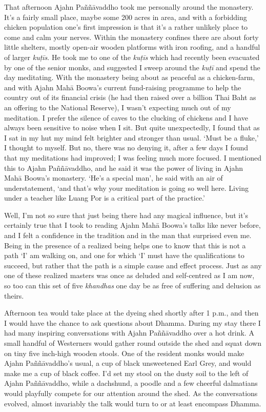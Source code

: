 That afternoon Ajahn Paññāvaddho took me personally around the
monastery. It's a fairly small place, maybe some 200 acres in area, and
with a forbidding chicken population one's first impression is that it's
a rather unlikely place to come and calm your nerves. Within the
monastery confines there are about forty little shelters, mostly
open-air wooden platforms with iron roofing, and a handful of larger
\emph{kuṭīs}. He took me to one of the \emph{kuṭīs} which had recently
been evacuated by one of the senior monks, and suggested I sweep around
the \emph{kuṭī} and spend the day meditating. With the monastery being
about as peaceful as a chicken-farm, and with Ajahn Mahā Boowa's current
fund-raising programme to help the country out of its financial crisis
 (he had then raised over a billion Thai Baht as an offering to the
National Reserve), I wasn't expecting much out of my meditation. I
prefer the silence of caves to the clucking of chickens and I have
always been sensitive to noise when I sit. But quite unexpectedly, I
found that as I sat in my hut my mind felt brighter and stronger than
usual. `Must be a fluke,' I thought to myself. But no, there was no
denying it, after a few days I found that my meditations had improved; I
was feeling much more focused. I mentioned this to Ajahn Paññāvaddho, 
and he said it was the power of living in Ajahn Mahā Boowa's monastery. 
`He's a special man', he said with an air of understatement, `and that's
why your meditation is going so well here. Living under a teacher like
Luang Por is a critical part of the practice.'

Well, I'm not so sure that
just being there had any magical influence, but it's certainly true that
I took to reading Ajahn Mahā Boowa's talks like never before, and I felt
a confidence in the tradition and in the man that surprised even me. 
Being in the presence of a realized being helps one to know that this is
not a path `I' am walking on, and one for which `I' must have the
qualifications to succeed, but rather that the path is a simple cause
and effect process. Just as any one of these realized masters was once
as deluded and self-centred as I am now, so too can this set of five
\emph{khandhas} one day be as free of suffering and delusion as theirs. 

Afternoon tea would take place at the dyeing shed shortly after 1 p.m.,
and then I would have the chance to ask questions about Dhamma. During
my stay there I had many inspiring conversations with Ajahn Paññāvaddho
over a hot drink. A small handful of Westerners would gather round
outside the shed and squat down on tiny five inch-high wooden stools. 
One of the resident monks would make Ajahn Paññāvaddho's usual, a cup of
black unsweetened Earl Grey, and would make me a cup of black coffee. 
I'd set my stool on the dusty soil to the left of Ajahn Paññāvaddho, 
while a dachshund, a poodle and a few cheerful dalmatians would
playfully compete for our attention around the shed. As the
conversations evolved, almost invariably the talk would turn to or at
least encompass Dhamma. 

